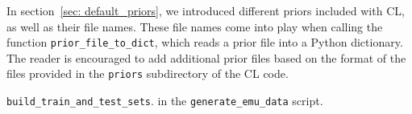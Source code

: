 
In section~\ref{sec: default_priors}, we introduced different priors 
included with CL, as well as their file names. These file names come into play 
when calling the function \verb|prior_file_to_dict|, which reads a prior file
into a Python dictionary. The reader is encouraged to add additional prior
files based on the format of the files provided in the \verb|priors|
subdirectory of the CL code.


\verb|build_train_and_test_sets|. in the
\verb|generate_emu_data| script.
